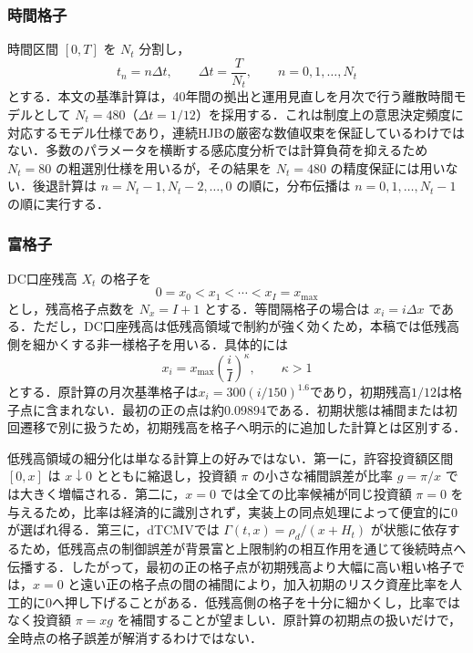 \documentclass[10pt,a4paper]{article}
\theoremstyle{plain}
\theoremstyle{definition}
\begin{document}
\subsubsection{時間格子}

時間区間 $[0,T]$ を $N_t$ 分割し，
\begin{equation}
  t_n=n\Delta t,
  \qquad
  \Delta t=\frac{T}{N_t},
  \qquad n=0,1,\ldots,N_t
  \label{eq:time-grid}
\end{equation}
とする．本文の基準計算は，40年間の拠出と運用見直しを月次で行う離散時間モデルとして $N_t=480$（$\Delta t=1/12$）を採用する．これは制度上の意思決定頻度に対応するモデル仕様であり，連続HJBの厳密な数値収束を保証しているわけではない．多数のパラメータを横断する感応度分析では計算負荷を抑えるため $N_t=80$ の粗選別仕様を用いるが，その結果を $N_t=480$ の精度保証には用いない．後退計算は $n=N_t-1,N_t-2,\ldots,0$ の順に，分布伝播は $n=0,1,\ldots,N_t-1$ の順に実行する．

\subsubsection{富格子}

DC口座残高 $X_t$ の格子を
\begin{equation}
  0=x_0<x_1<\cdots<x_I=x_{\max}
  \label{eq:wealth-grid}
\end{equation}
とし，残高格子点数を $N_x=I+1$ とする．等間隔格子の場合は $x_i=i\Delta x$ である．ただし，DC口座残高は低残高領域で制約が強く効くため，本稿では低残高側を細かくする非一様格子を用いる．具体的には
\begin{equation}
  x_i=x_{\max}\left(\frac{i}{I}\right)^\kappa,
  \qquad \kappa>1
  \label{eq:nonuniform-grid}
\end{equation}
とする．原計算の月次基準格子は$x_i=300(i/150)^{1.6}$であり，初期残高$1/12$は格子点に含まれない．最初の正の点は約0.09894である．初期状態は補間または初回遷移で別に扱うため，初期残高を格子へ明示的に追加した計算とは区別する．

低残高領域の細分化は単なる計算上の好みではない．第一に，許容投資額区間 $[0,x]$ は $x\downarrow0$ とともに縮退し，投資額 $\pi$ の小さな補間誤差が比率 $g=\pi/x$ では大きく増幅される．第二に，$x=0$ では全ての比率候補が同じ投資額 $\pi=0$ を与えるため，比率は経済的に識別されず，実装上の同点処理によって便宜的に0が選ばれ得る．第三に，dTCMVでは $\Gamma(t,x)=\rho_d/(x+H_t)$ が状態に依存するため，低残高点の制御誤差が背景富と上限制約の相互作用を通じて後続時点へ伝播する．したがって，最初の正の格子点が初期残高より大幅に高い粗い格子では，$x=0$ と遠い正の格子点の間の補間により，加入初期のリスク資産比率を人工的に0へ押し下げることがある．低残高側の格子を十分に細かくし，比率ではなく投資額 $\pi=xg$ を補間することが望ましい．原計算の初期点の扱いだけで，全時点の格子誤差が解消するわけではない．
\end{document}
